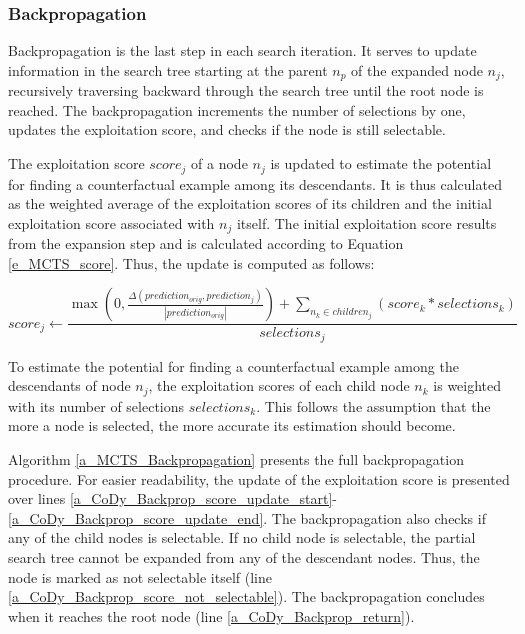 \subsubsection{Backpropagation}
\label{s_Methodology_CoDy_Backpropagation}

Backpropagation is the last step in each search iteration. It serves to update information in the search tree starting at the parent $n_p$ of the expanded node $n_j$, recursively traversing backward through the search tree until the root node is reached. The backpropagation increments the number of selections by one, updates the exploitation score, and checks if the node is still selectable.

The exploitation score $score_j$ of a node $n_j$ is updated to estimate the potential for finding a counterfactual example among its descendants. It is thus calculated as the weighted average of the exploitation scores of its children and the initial exploitation score associated with $n_j$ itself. The initial exploitation score results from the expansion step and is calculated according to Equation \ref{e_MCTS_score}. Thus, the update is computed as follows:

\begin{equation}
    score_j \gets \frac{
        \max\left(0, \frac{\Delta(prediction_{orig}, prediction_j)}{|prediction_{orig}|}\right) + \sum_{n_k \in children_j} (score_k * selections_k)
    }{
        selections_j
    }
\end{equation}

To estimate the potential for finding a counterfactual example among the descendants of node $n_j$, the exploitation scores of each child node $n_k$ is weighted with its number of selections $selections_k$. This follows the assumption that the more a node is selected, the more accurate its estimation should become.

Algorithm \ref{a_MCTS_Backpropagation} presents the full backpropagation procedure. For easier readability, the update of the exploitation score is presented over lines \ref{a_CoDy_Backprop_score_update_start}-\ref{a_CoDy_Backprop_score_update_end}. The backpropagation also checks if any of the child nodes is selectable. If no child node is selectable, the partial search tree cannot be expanded from any of the descendant nodes. Thus, the node is marked as not selectable itself (line \ref{a_CoDy_Backprop_score_not_selectable}). The backpropagation concludes when it reaches the root node (line \ref{a_CoDy_Backprop_return}).

